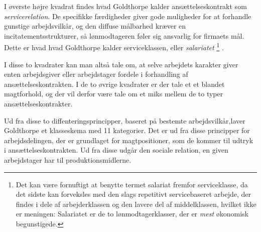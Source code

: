 I øverste højre kvadrat findes hvad Goldthorpe kalder ansættelseskontrakt som \emph{servicerelation}. De specifikke færdigheder giver gode muligheder for at forhandle gunstige arbejdsvilkår, og den diffuse målbarhed  kræver en incitatementsstrukturer, så lønmodtageren føler sig ansvarlig for firmaets mål. Dette er hvad hvad Goldthorpe kalder serviceklassen, eller \emph{salariatet}%
%
\footnote{Det kan være fornuftigt at benytte termet salariat fremfor serviceklasse, da det sidste kan forveksles med den slags repetitivt servicebaseret arbejde, der findes i dele af arbejderklassen og den lavere del af middelklassen, hvilket ikke er meningen: Salariatet er de to lønmodtagerklasser, der er \emph{mest} økonomisk begunstigede.}%
%
 \parencite[22]{GoldthorpeMcKnight2004}. %

I disse to kvadrater kan man altså tale om, at selve arbejdets karakter giver enten arbejdsgiver eller arbejdstager fordele i forhandling af ansættelseskontrakten. I de to øvrige kvadrater er der tale et et blandet magtforhold, og der vil derfor være tale om et miks mellem de to typer ansættelseskontrakter. 

Ud fra disse to diffenteringsprincipper, baseret på bestemte arbejdsvilkår,laver Goldthorpe et klasseskema med 11 kategorier. Det er ud fra disse principper for arbejdsdelingen, der er grundlaget for magtpositioner, som de kommer til udtryk i ansættelseskontrakten. Ud fra disse udgår den sociale relation, en given arbejdstager har til produktionsmidlerne. %


\label{klasse egp11}



